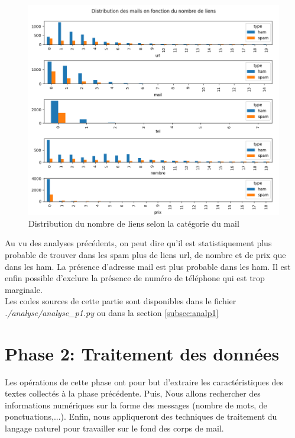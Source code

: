 \documentclass[a4paper,12pt]{article}
\begin{document}
			\begin{figure}[H]
				\includegraphics[width=\linewidth]{img/P1feat.png}
				\caption{Distribution du nombre de liens selon la catégorie du mail}
			\end{figure}
			
			
			Au vu des analyses précédents, on peut dire qu'il est statistiquement plus probable de trouver dans les spam plus de liens url, de nombre et de prix que dans les ham. La présence d'adresse mail est plus probable dans les ham. Il est enfin possible d'exclure la présence de numéro de téléphone qui est trop marginale.\\
			
			Les codes sources de cette partie sont disponibles dans le fichier \emph{./analyse/analyse\_p1.py} ou dans la section \ref{subsec:analp1}
			
			
			
 
	
\newpage
\section{Phase 2: Traitement des données}
	Les opérations de cette phase ont pour but d'extraire les caractéristiques des textes collectés à la phase précédente. 
	Puis, Nous allons rechercher des informations numériques sur la forme des messages (nombre de mots, de ponctuations,...).  
	Enfin, nous appliqueront des techniques de traitement du langage naturel pour travailler sur le fond des corps de mail. 
	
\end{document}
